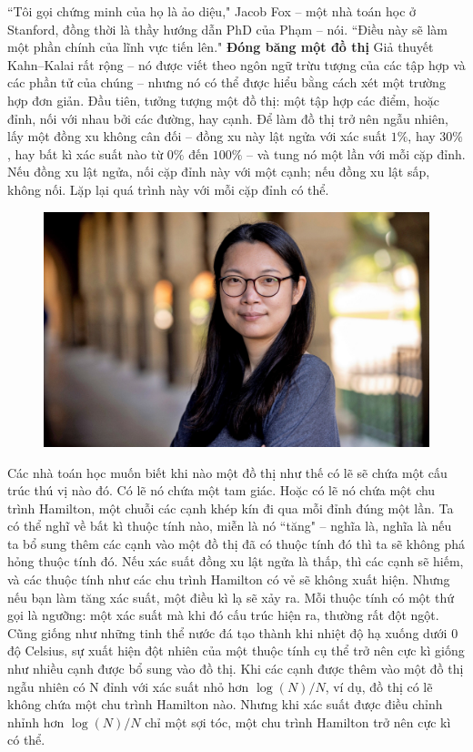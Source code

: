 \begin{multicols}{2}
	\vskip 0.1cm
	``Tôi gọi chứng minh của họ là ảo diệu,"  Jacob Fox -- một nhà toán học ở Stanford, đồng thời là thầy hướng dẫn PhD của Phạm -- nói. ``Điều này sẽ làm một phần chính của lĩnh vực tiến lên."
	\vskip 0.1cm
	\textbf{\color{duongvaotoanhoc}Đóng băng một đồ thị}
	\vskip 0.1cm
	Giả thuyết Kahn--Kalai rất rộng -- nó được viết theo ngôn ngữ trừu tượng của các tập hợp và các phần tử của chúng -- nhưng nó có thể được hiểu bằng cách xét một trường hợp đơn giản. Đầu tiên, tưởng tượng một đồ thị: một tập hợp các điểm, hoặc đỉnh, nối với nhau bởi các đường, hay cạnh. Để làm đồ thị trở nên ngẫu nhiên, lấy một đồng xu không cân đối -- đồng xu này lật ngửa với xác suất $1\%$, hay $30\%$, hay bất kì xác suất nào từ $0\%$ đến $100\%$ -- và tung nó một lần với mỗi cặp đỉnh. Nếu đồng xu lật ngửa, nối cặp đỉnh này với một cạnh; nếu đồng xu lật sấp, không nối. Lặp lại quá trình này với mỗi cặp đỉnh có thể.
	\begin{figure}[H]
		\vspace*{-5pt}
		\centering
		\captionsetup{labelformat= empty, justification=centering}
		\includegraphics[width= 1\linewidth]{2}
		\vspace*{-15pt}
	\end{figure}
	Các nhà toán học muốn biết khi nào một đồ thị như thế có lẽ sẽ chứa một cấu trúc thú vị nào đó. Có lẽ nó chứa một tam giác. Hoặc có lẽ nó chứa một chu trình Hamilton, một chuỗi các cạnh khép kín đi qua mỗi đỉnh đúng một lần. Ta có thể nghĩ về bất kì thuộc tính nào, miễn là nó ``tăng" -- nghĩa là, nghĩa là nếu ta bổ sung thêm các cạnh vào một đồ thị đã có thuộc tính đó thì ta sẽ không phá hỏng thuộc tính đó.
	\vskip 0.1cm
	Nếu xác suất đồng xu lật ngửa là thấp, thì các cạnh sẽ hiếm, và các thuộc tính như các chu trình Hamilton có vẻ sẽ không xuất hiện. Nhưng nếu bạn làm tăng xác suất, một điều kì lạ sẽ xảy ra. Mỗi thuộc tính có một thứ gọi là ngưỡng: một xác suất mà khi đó cấu trúc hiện ra, thường rất đột ngột. Cũng giống như những tinh thể nước đá tạo thành khi nhiệt độ hạ xuống dưới 0 độ Celsius, sự xuất hiện đột nhiên của một thuộc tính cụ thể trở nên cực kì giống như nhiều cạnh được bổ sung vào đồ thị. Khi các cạnh được thêm vào một đồ thị ngẫu nhiên có N đỉnh với xác suất nhỏ hơn $\log(N)/N$, ví dụ, đồ thị có lẽ không chứa một chu trình Hamilton nào. Nhưng khi xác suất được điều chỉnh nhỉnh hơn $\log(N)/N$ chỉ một sợi tóc, một chu trình Hamilton trở nên cực kì có thể.

\end{multicols}
